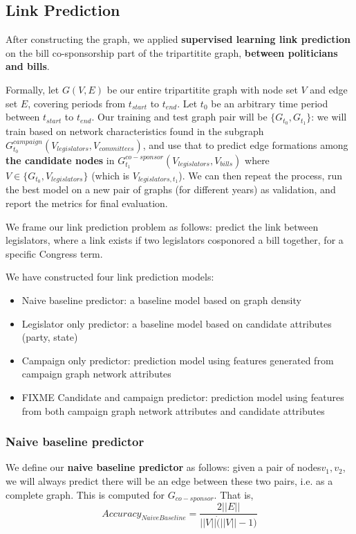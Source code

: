 \documentclass[12pt,twocolumn]{article}
\begin{document}
\subsection{Link Prediction}
After constructing the graph, we applied \textbf{supervised learning link prediction} on the bill co-sponsorship part of the tripartitite graph, \textbf{between politicians and bills}.

Formally, let $G(V,E)$ be our entire tripartitite graph with node set $V$ and edge set $E$, covering periods from $t_{start}$ to $t_{end}$. Let $t_0$ be an arbitrary time period between  $t_{start}$ to $t_{end}$. Our training and test graph pair will be $\{G_{t_{0}}, G_{t_{1}}\}$: we will train based on network characteristics found in the subgraph $G^{campaign}_{t_{0}}(V_{legislators}, V_{committees})$, and use that to predict edge formations among \textbf{the candidate nodes} in $G^{co-sponsor}_{t_{1}}(V_{legislators},V_{bills})$ where $V \in \{G_{t_{0}}, V_{legislators}\}$ (which is $V_{legislators, t_1}$). We can then repeat the process, run the best model on a new pair of graphs (for different years) as validation, and report the metrics for final evaluation. 

We frame our link prediction problem as follows: predict the link between legislators, where a link exists if two legislators cosponored a bill together, for a specific Congress term.  

We have constructed four link prediction models:
\begin{itemize}
    \item Naive baseline predictor: a baseline model based on graph density
    \item Legislator only predictor: a baseline model based on candidate attributes (party, state)
    \item Campaign only predictor: prediction model using features generated from campaign graph network attributes
    \item FIXME Candidate and campaign predictor: prediction model using features from both campaign graph network attributes and candidate attributes
\end{itemize}


\subsubsection{Naive baseline predictor}
We define our \textbf{naive baseline predictor} as follows: given a pair of nodes$v_1, v_2$, we will always predict there will be an edge between these two pairs, i.e. as a complete graph. This is computed for $G_{co-sponsor}$.  That is, $$Accuracy_{Naive Baseline} = \frac{2||E||}{||V|| \dot (||V|| - 1)} $$
\end{document}
